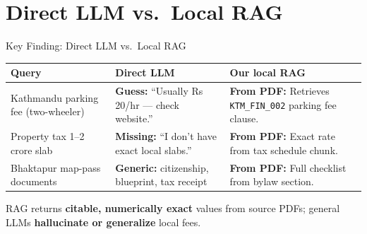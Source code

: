 \documentclass[11pt,aspectratio=169]{beamer}
\begin{document}
\section{Direct LLM vs.\ Local RAG}
\begin{frame}{Key Finding: Direct LLM vs.\ Local RAG}
  \footnotesize
  \begin{tabular}{@{}p{2.9cm}p{4.6cm}p{4.6cm}@{}}
    \toprule
    \textbf{Query} & \textbf{Direct LLM} & \textbf{Our local RAG} \\
    \midrule
    Kathmandu parking fee (two-wheeler) &
    \textcolor{RouteRed}{\textbf{Guess:}} ``Usually Rs 20/hr — check website.'' &
    \textcolor{RouteGreen}{\textbf{From PDF:}} Retrieves \texttt{KTM\_FIN\_002} parking fee clause. \\
    \addlinespace
    Property tax 1--2 crore slab &
    \textcolor{RouteRed}{\textbf{Missing:}} ``I don't have exact local slabs.'' &
    \textcolor{RouteGreen}{\textbf{From PDF:}} Exact rate from tax schedule chunk. \\
    \addlinespace
    Bhaktapur map-pass documents &
    \textcolor{RouteRed}{\textbf{Generic:}} citizenship, blueprint, tax receipt &
    \textcolor{RouteGreen}{\textbf{From PDF:}} Full checklist from bylaw section. \\
    \bottomrule
  \end{tabular}
  \vspace{0.15cm}
  \small RAG returns \textbf{citable, numerically exact} values from source PDFs; general LLMs \textbf{hallucinate or generalize} local fees.
\end{frame}

\end{document}
